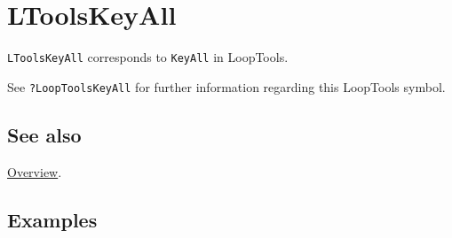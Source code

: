\documentclass[../FeynHelpersManual.tex]{subfiles}
\begin{document}
\hypertarget{ltoolskeyall}{
\section{LToolsKeyAll}\label{ltoolskeyall}}

\texttt{LToolsKeyAll} corresponds to \texttt{KeyAll} in LoopTools.

See \texttt{?LoopTools\textasciigrave KeyAll} for further information
regarding this LoopTools symbol.

\subsection{See also}

\hyperlink{toc}{Overview}.

\subsection{Examples}
\end{document}
